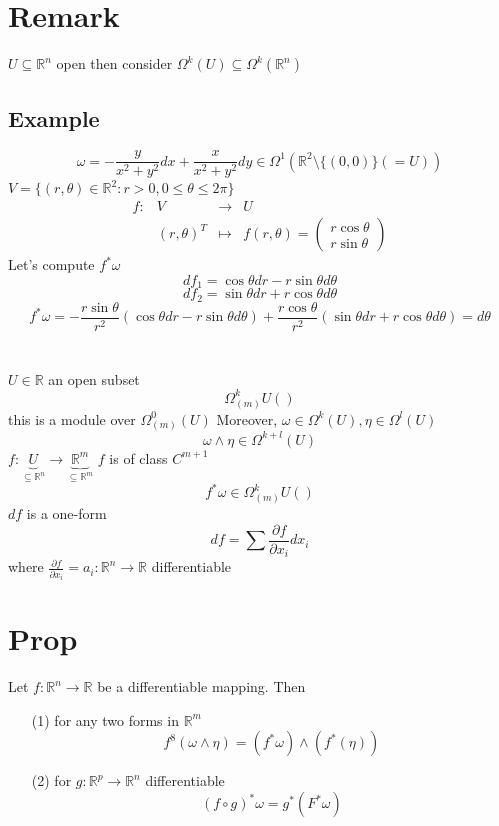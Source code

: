 \documentclass{book}
\begin{document}
\section{Remark}
$U\subseteq\mathbb{R}^n$ open then consider $\Omega^k(U)\subseteq \Omega^k(\mathbb{R}^n)$
\subsection*{Example}$$
\omega=-\frac{y}{x^2+y^2}dx+\frac{x}{x^2+y^2}dy\in \Omega^1(\mathbb{R}^2\setminus\{(0,0)\}(=U))$$
$V=\{(r,\theta)\in \mathbb{R}^2:r>0,0\leq\theta\leq 2\pi\}$
$$\begin{aligned}
    f: &V&\rightarrow &U\\
    &(r,\theta)^T&\mapsto &f(r,\theta)=\begin{pmatrix}
        r\cos\theta\\r\sin\theta
    \end{pmatrix}
\end{aligned}$$
Let's compute $f^*\omega$
$$df_1=\cos\theta dr-r\sin\theta d\theta$$
$$df_2=\sin\theta dr+r\cos\theta d\theta$$
$$f^*\omega=-\frac{r\sin\theta}{r^2}(\cos\theta dr-r\sin\theta d\theta)+\frac{r\cos\theta}{r^2}(\sin\theta dr+r\cos\theta d\theta)=d\theta$$
















\section{}
$U\in \mathbb{R}$ an open subset
$$\Omega_{(m)}^kU()$$
this is a module over $\Omega^0_{(m)}(U)$ 
Moreover, $\omega\in \Omega^k(U),\eta\in \Omega^l(U)$
$$\omega\wedge\eta\in \Omega^{k+l}(U)$$
$f:\underbrace{U}\limits_{\subseteq\mathbb{R}^n}\rightarrow \underbrace{\mathbb{R}^m}\limits_{\subseteq\mathbb{R}^m}$
$f$ is of class $C^{m+1}$
$$f^*\omega\in \Omega_{(m)}^kU()$$
$df$ is a one-form$$df=\sum\frac{\partial f}{\partial x_i}dx_i$$
where $\frac{\partial f}{\partial x_i}=a_i:\mathbb{R}^n\rightarrow\mathbb{R}$ differentiable
\section{Prop}
Let $f:\mathbb{R}^n\rightarrow\mathbb{R}$ be a differentiable mapping. Then
\begin{itemize}
    \item [(1)]for any two forms in $\mathbb{R}^m$$$f^8(\omega\wedge\eta)=(f^*\omega)\wedge(f^*(\eta))$$
    \item [(2)]for $g:\mathbb{R}^p\rightarrow\mathbb{R}^n$ differentiable$$(f\circ g)^*\omega=g^*(F^*\omega)$$
\end{itemize}
\end{document}
